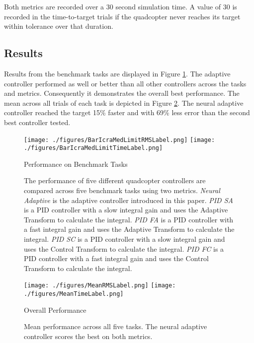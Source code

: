 \documentclass[letterpaper, 10 pt, conference]{ieeeconf}  %
\begin{document}
Both metrics are recorded over a 30 second simulation time.
A value of 30 is recorded in the time-to-target trials if the quadcopter never reaches its target within tolerance over that duration.

\subsection{Results}

Results from the benchmark tasks are displayed in Figure \ref{fig:Benchmarks}.
The adaptive controller performed as well or better than all other controllers across the tasks and metrics.
Consequently it demonstrates the overall best performance.
The mean across all trials of each task is depicted in Figure \ref{fig:OverallPerformance}.
The neural adaptive controller reached the target 15\% faster and with 69\% less error than the second best controller tested.

\begin{figure}
\centering
\texttt{[image: ./figures/BarIcraMedLimitRMSLabel.png]}
\texttt{[image: ./figures/BarIcraMedLimitTimeLabel.png]}
\caption{Performance on Benchmark Tasks}
\label{fig:Benchmarks}
\captionsetup{singlelinecheck=off,font=footnotesize}
\caption*{The performance of five different quadcopter controllers are compared across five benchmark tasks using two metrics. \textit{Neural Adaptive} is the adaptive controller introduced in this paper. \textit{PID SA} is a PID controller with a slow integral gain and uses the Adaptive Transform to calculate the integral. \textit{PID FA} is a PID controller with a fast integral gain and uses the Adaptive Transform to calculate the integral. \textit{PID SC} is a PID controller with a slow integral gain and uses the Control Transform to calculate the integral. \textit{PID FC} is a PID controller with a fast integral gain and uses the Control Transform to calculate the integral.}
\end{figure}

\begin{figure}
\centering
\texttt{[image: ./figures/MeanRMSLabel.png]}
\texttt{[image: ./figures/MeanTimeLabel.png]}
\caption{Overall Performance}
\label{fig:OverallPerformance}
\captionsetup{singlelinecheck=off,font=footnotesize}
\caption*{Mean performance across all five tasks. The neural adaptive controller scores the best on both metrics.}
\end{figure}
\end{document}
